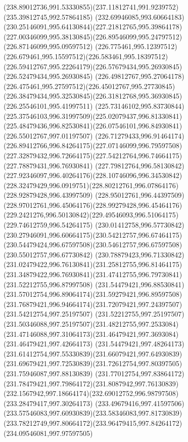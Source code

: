 {{	\curveto(238.89012736,991.53330855)(237.11812741,991.9239752)(235.39812745,992.57864185)
	\curveto(232.69946085,993.60664183)(230.25146091,995.64130844)(227.21812765,995.39864178)
	\curveto(227.00346099,995.38130845)(226.89546099,995.24797512)(226.87146099,995.09597512)
	\curveto(226.775461,995.12397512)(226.679461,995.15597512)(226.583461,995.18397512)
	\curveto(226.59412767,995.22264179)(226.57679434,995.26930845)(226.52479434,995.26930845)
	\curveto(226.49812767,995.27064178)(226.475461,995.27597512)(226.45012767,995.27730845)
	\curveto(226.38479434,995.32530845)(226.31812768,995.36930845)(226.25546101,995.41997511)
	\curveto(225.73146102,995.83730844)(225.37546103,996.31997509)(225.02079437,996.81330841)
	\curveto(225.48479436,996.82530841)(226.07546101,996.84930841)(226.55012767,997.01197507)
	\curveto(226.71279433,996.91464174)(226.89412766,996.84264175)(227.07146099,996.79597508)
	\curveto(227.32879432,996.72664175)(227.54212764,996.74664175)(227.78879431,996.76930841)
	\curveto(227.79812764,996.58130842)(227.92346097,996.40264176)(228.10746096,996.34530842)
	\curveto(228.32479429,996.0919751)(228.80212761,996.07864176)(228.92879428,996.43997509)
	\curveto(228.95012761,996.44397509)(228.97012761,996.45064176)(228.99279428,996.45464176)
	\curveto(229.2421276,996.50130842)(229.49546093,996.51064175)(229.74612759,996.54264175)
	\curveto(230.01412758,996.57730842)(230.27946091,996.60664175)(230.54212757,996.67464175)
	\curveto(230.54479424,996.67597508)(230.54612757,996.67597508)(230.55012757,996.67730842)
	\curveto(230.78879423,996.71330842)(231.02479422,996.76130841)(231.25812755,996.81464175)
	\curveto(231.34879422,996.76930841)(231.47412755,996.79730841)(231.52212755,996.87997508)
	\curveto(231.54479421,996.88530841)(231.57012754,996.89064174)(231.59279421,996.89597508)
	\curveto(231.76879421,996.94664174)(231.72079421,997.24397507)(231.54212754,997.25197507)
	\curveto(231.52212755,997.25197507)(231.50346088,997.25197507)(231.48212755,997.2533084)
	\curveto(231.47146088,997.31064173)(231.46479421,997.3693084)(231.46479421,997.42664173)
	\curveto(231.54479421,997.48264173)(231.61412754,997.55330839)(231.66079421,997.64930839)
	\curveto(231.69679421,997.72530839)(231.72612754,997.80397505)(231.75946087,997.88130839)
	\curveto(231.77012754,997.83864172)(231.78479421,997.79864172)(231.8087942,997.76130839)
	\curveto(232.1567942,997.18664174)(232.69012752,996.98797508)(233.28479417,997.30264173)
	\curveto(233.49679416,997.41597506)(233.57546083,997.60930839)(233.58346083,997.81730839)
	\curveto(233.78212749,997.80664172)(233.96479415,997.84264172)(234.09546081,997.97597505)
}}
